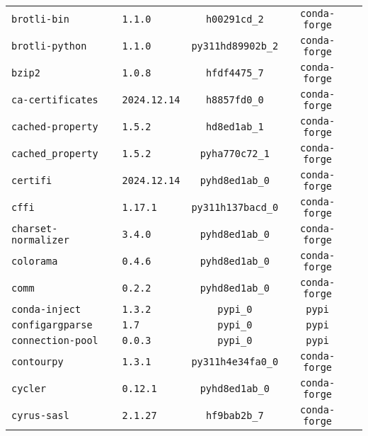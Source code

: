\begin{longtable}{p{}|l|ccc}
\texttt{brotli-bin}                & \texttt{1.1.0}              & \texttt{h00291cd\_2}      & \texttt{conda-forge}\\
\texttt{brotli-python}             & \texttt{1.1.0}              & \texttt{py311hd89902b\_2} & \texttt{conda-forge}\\
\texttt{bzip2}                     & \texttt{1.0.8}              & \texttt{hfdf4475\_7}      & \texttt{conda-forge}\\
\texttt{ca-certificates}           & \texttt{2024.12.14}         & \texttt{h8857fd0\_0}      & \texttt{conda-forge}\\
\texttt{cached-property}           & \texttt{1.5.2}              & \texttt{hd8ed1ab\_1}      & \texttt{conda-forge}\\
\texttt{cached\_property}           & \texttt{1.5.2}              & \texttt{pyha770c72\_1}    & \texttt{conda-forge}\\
\texttt{certifi}                   & \texttt{2024.12.14}         & \texttt{pyhd8ed1ab\_0}    & \texttt{conda-forge}\\
\texttt{cffi}                      & \texttt{1.17.1}             & \texttt{py311h137bacd\_0} & \texttt{conda-forge}\\
\texttt{charset-normalizer}        & \texttt{3.4.0}              & \texttt{pyhd8ed1ab\_0}    & \texttt{conda-forge}\\
\texttt{colorama}                  & \texttt{0.4.6}              & \texttt{pyhd8ed1ab\_0}    & \texttt{conda-forge}\\
\texttt{comm}                      & \texttt{0.2.2}              & \texttt{pyhd8ed1ab\_0}    & \texttt{conda-forge}\\
\texttt{conda-inject}              & \texttt{1.3.2}              & \texttt{pypi\_0}          & \texttt{pypi}\\
\texttt{configargparse}            & \texttt{1.7}                & \texttt{pypi\_0}          & \texttt{pypi}\\
\texttt{connection-pool}           & \texttt{0.0.3}              & \texttt{pypi\_0}          & \texttt{pypi}\\
\texttt{contourpy}                 & \texttt{1.3.1}              & \texttt{py311h4e34fa0\_0} & \texttt{conda-forge}\\
\texttt{cycler}                    & \texttt{0.12.1}             & \texttt{pyhd8ed1ab\_0}    & \texttt{conda-forge}\\
\texttt{cyrus-sasl}                & \texttt{2.1.27}             & \texttt{hf9bab2b\_7}      & \texttt{conda-forge}\\

\end{longtable}
